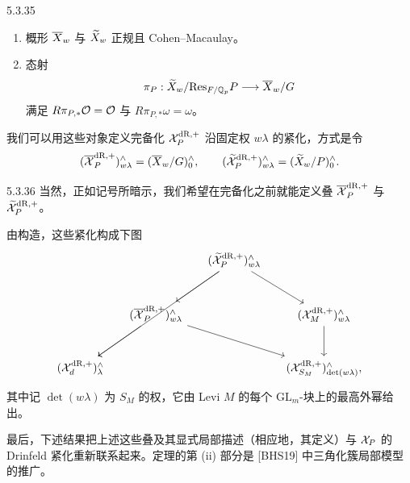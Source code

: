 \begin{hyp}{5.3.35}\label{thm:a4-5-3-35}
\begin{enumerate}[label=(\roman*),leftmargin=2.2em,itemsep=0.1em]
\item 概形 $\overline X_w$ 与 $\widetilde X_w$ 正规且 Cohen--Macaulay。
\item 态射
\[
\pi_P:\widetilde X_w/\mathrm{Res}_{F/\mathbb{Q}_p}P\longrightarrow\overline X_w/G
\]
满足 $R\pi_{P,*}\mathcal{O}=\mathcal{O}$ 与 $R\pi_{P,*}\omega=\omega$。
\end{enumerate}
\end{hyp}

我们可以用这些对象定义完备化 $\mathcal{X}_P^{\mathrm{dR},+}$ 沿固定权 $w\lambda$ 的紧化，方式是令
\[
(\overline{\mathcal{X}}_P^{\mathrm{dR},+})^{\wedge}_{w\lambda}=(\overline X_w/G)^{\wedge}_0,\qquad
(\widetilde{\mathcal{X}}_P^{\mathrm{dR},+})^{\wedge}_{w\lambda}=(\widetilde X_w/P)^{\wedge}_0.
\]

\begin{rem}{5.3.36}\label{thm:a4-5-3-36}
当然，正如记号所暗示，我们希望在完备化之前就能定义叠 $\overline{\mathcal{X}}_P^{\mathrm{dR},+}$ 与 $\widetilde{\mathcal{X}}_P^{\mathrm{dR},+}$。
\end{rem}

由构造，这些紧化构成下图
\[
\begin{tikzcd}[row sep=large,column sep=1.4em]
 & & (\wt\XX_P^{\mathrm{dR},+})^{\wedge}_{w\lambda}\arrow[ddll]\arrow[dl]\arrow[dr] & \\
 & (\ol\XX_P^{\mathrm{dR},+})^{\wedge}_{w\lambda}\arrow[dl]\arrow[drr] & & (\XX_M^{\mathrm{dR},+})^{\wedge}_{w\lambda}\arrow[d]\\
 (\XX_d^{\mathrm{dR},+})^{\wedge}_{\lambda} & & & (\XX_{S_M}^{\mathrm{dR},+})^{\wedge}_{\det(w\lambda)},
\end{tikzcd}
\]
其中记 $\det(w\lambda)$ 为 $S_M$ 的权，它由 Levi $M$ 的每个 $\mathrm{GL}_m$-块上的最高外幂给出。

最后，下述结果把上述这些叠及其显式局部描述（相应地，其定义）与 $\mathcal{X}_P$ 的 Drinfeld 紧化重新联系起来。定理的第 (ii) 部分是 [BHS19] 中三角化簇局部模型的推广。

